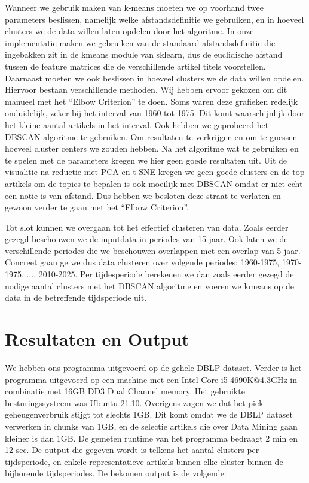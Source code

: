 \documentclass[11pt]{article}
\begin{document}
Wanneer we gebruik maken van k-means moeten we op voorhand twee parameters beslissen, namelijk welke afstandsdefinitie we gebruiken, en in hoeveel clusters we de data willen laten opdelen door het algoritme. In onze implementatie maken we gebruiken van de standaard afstandsdefinitie die ingebakken zit in de kmeans module van sklearn, dus de euclidische afstand tussen de feature matrices die de verschillende artikel titels voorstellen. Daarnaast moeten we ook beslissen in hoeveel clusters we de data willen opdelen. Hiervoor bestaan verschillende methoden.
Wij hebben ervoor gekozen om dit manueel met het ``Elbow Criterion'' te doen. Soms waren deze grafieken redelijk onduidelijk, zeker bij het interval van 1960 tot 1975. Dit komt waarschijnlijk door het kleine aantal artikels in het interval. Ook hebben we geprobeerd het DBSCAN algoritme te gebruiken. Om resultaten te verkrijgen en om te guessen hoeveel cluster centers we zouden hebben. Na het algoritme wat te gebruiken en te spelen met de parameters kregen we hier geen goede resultaten uit. Uit de visualitie na reductie met PCA en t-SNE kregen we geen goede clusters en de top artikels om de topics te bepalen is ook moeilijk met DBSCAN omdat er niet echt een notie is van afstand. Dus hebben we besloten deze straat te verlaten en gewoon verder te gaan met het ``Elbow Criterion''.


Tot slot kunnen we overgaan tot het effectief clusteren van data. Zoals eerder gezegd beschouwen we de inputdata in periodes van 15 jaar. Ook laten we de verschillende periodes die we beschouwen overlappen met een overlap van 5 jaar. Concreet gaan ge we dus data clusteren over volgende periodes: 1960-1975, 1970-1975, ..., 2010-2025. Per tijdesperiode berekenen we dan zoals eerder gezegd de nodige aantal clusters met het DBSCAN algoritme en voeren we kmeans op de data in de betreffende tijdsperiode uit. 

\section{Resultaten en Output}

We hebben ons programma uitgevoerd op de gehele DBLP dataset. Verder is het programma uitgevoerd op een machine met een Intel Core i5-4690K@4.3GHz in combinatie met 16GB DD3 Dual Channel memory. Het gebruikte besturingssysteem was Ubuntu 21.10. Overigens zagen we dat het piek geheugenverbruik stijgt tot slechts 1GB. Dit komt omdat we de DBLP dataset verwerken in chunks van 1GB, en de selectie artikels die over Data Mining gaan kleiner is dan 1GB. De gemeten runtime van het programma bedraagt 2 min en 12 sec. De output die gegeven wordt is telkens het aantal clusters per tijdsperiode, en enkele representatieve artikels binnen elke cluster binnen de bijhorende tijdsperiodes. De bekomen output is de volgende:
\end{document}
